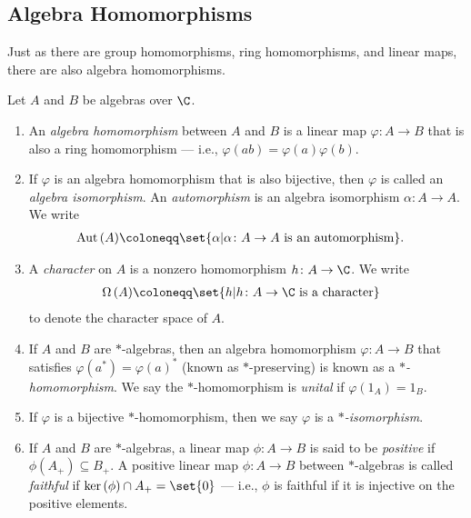 \subsection{Algebra Homomorphisms}%
Just as there are group homomorphisms, ring homomorphisms, and linear maps, there are also algebra homomorphisms.
\begin{definition}\label{def:algebra_homomorphisms_and_characters}
  Let $A$ and $B$ be algebras over $\C$.
  \begin{enumerate}[(1)]
    \item An \textit{algebra homomorphism} between $A$ and $B$ is a linear map $\varphi\colon A\rightarrow B$ that is also a ring homomorphism --- i.e., $\varphi\left(ab\right) = \varphi\left(a\right)\varphi\left(b\right)$.
    \item If $\varphi$ is an algebra homomorphism that is also bijective, then $\varphi$ is called an \textit{algebra isomorphism}. An \textit{automorphism} is an algebra isomorphism $\alpha\colon A\rightarrow A$. We write
      \begin{align*}
        \operatorname{Aut}\left(A\right) &\coloneq \set{\alpha | \alpha\colon A\rightarrow A\text{ is an automorphism}}.
      \end{align*}
    \item A \textit{character} on $A$ is a nonzero homomorphism $h\colon A\rightarrow \C$. We write
      \begin{align*}
        \Omega\left(A\right) &\coloneq \set{h | h\colon A\rightarrow \C\text{ is a character}}
      \end{align*}
      to denote the character space of $A$.
    \item If $A$ and $B$ are $\ast$-algebras, then an algebra homomorphism $\varphi\colon A\rightarrow B$ that satisfies $\varphi\left(a^{\ast}\right) = \varphi\left(a\right)^{\ast}$ (known as $\ast$-preserving) is known as a \textit{$\ast$-homomorphism}. We say the $\ast$-homomorphism is \textit{unital} if $\varphi\left( 1_A \right) = 1_B$.
    \item If $\varphi$ is a bijective $\ast$-homomorphism, then we say $\varphi$ is a \textit{$\ast$-isomorphism}.
    \item If $A$ and $B$ are $\ast$-algebras, a linear map $\phi\colon A\rightarrow B$ is said to be \textit{positive} if $\phi\left(A_{+}\right)\subseteq B_{+}$. A positive linear map $\phi\colon A\rightarrow B$ between $\ast$-algebras is called \textit{faithful} if $\ker\left(\phi\right)\cap A_{+} = \set{0}$ --- i.e., $\phi$ is faithful if it is injective on the positive elements.
  \end{enumerate}
\end{definition}
